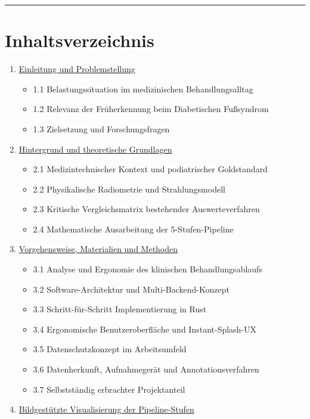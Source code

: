 \documentclass[
  11pt,
]{article}
\providecommand{\tightlist}{%
  \setlength{\itemsep}{0pt}\setlength{\parskip}{0pt}}
\begin{document}
\begin{center}\rule{0.5\linewidth}{0.5pt}\end{center}

\section{Inhaltsverzeichnis}\label{inhaltsverzeichnis}

\begin{enumerate}
\def\labelenumi{\arabic{enumi}.}
\tightlist
\item
  \hyperref[1-einleitung-und-problemstellung]{Einleitung und
  Problemstellung}

  \begin{itemize}
  \tightlist
  \item
    1.1 Belastungssituation im medizinischen Behandlungsalltag
  \item
    1.2 Relevanz der Früherkennung beim Diabetischen Fußsyndrom
  \item
    1.3 Zielsetzung und Forschungsfragen
  \end{itemize}
\item
  \hyperref[2-hintergrund-und-theoretische-grundlagen]{Hintergrund und
  theoretische Grundlagen}

  \begin{itemize}
  \tightlist
  \item
    2.1 Medizintechnischer Kontext und podiatrischer Goldstandard
  \item
    2.2 Physikalische Radiometrie und Strahlungsmodell
  \item
    2.3 Kritische Vergleichsmatrix bestehender Auswerteverfahren
  \item
    2.4 Mathematische Ausarbeitung der 5-Stufen-Pipeline
  \end{itemize}
\item
  \hyperref[3-vorgehensweise-materialien-und-methoden]{Vorgehensweise,
  Materialien und Methoden}

  \begin{itemize}
  \tightlist
  \item
    3.1 Analyse und Ergonomie des klinischen Behandlungsablaufs
  \item
    3.2 Software-Architektur und Multi-Backend-Konzept
  \item
    3.3 Schritt-für-Schritt Implementierung in Rust
  \item
    3.4 Ergonomische Benutzeroberfläche und Instant-Splash-UX
  \item
    3.5 Datenschutzkonzept im Arbeitsumfeld
  \item
    3.6 Datenherkunft, Aufnahmegerät und Annotationsverfahren
  \item
    3.7 Selbstständig erbrachter Projektanteil
  \end{itemize}
\item
  \hyperref[4-bildgestuxfctzte-visualisierung-der-pipeline-stufen]{Bildgestützte
  Visualisierung der Pipeline-Stufen}


\end{enumerate}
\end{document}
